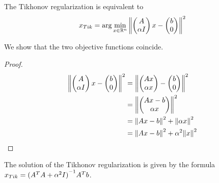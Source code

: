 \documentclass[ComputationalMathematics.tex]{subfiles}
\begin{document}
\begin{proposition}
The Tikhonov regularization is equivalent to 
\begin{equation} \label{eq:7novxtik}
  x_{Tik} = \arg \min_{x\in\mathbb{R}^n} {\left\lVert\begin{pmatrix}
    A\\
    \alpha I
\end{pmatrix} x - \begin{pmatrix}
    b\\0
\end{pmatrix}\right\rVert}^2
\end{equation}
\end{proposition}
We show that the two objective functions coincide.
\begin{proof}
  \begin{equation}
    \begin{aligned}
      {\left\lVert\begin{pmatrix}
        A\\
        \alpha I
      \end{pmatrix} x -
      \begin{pmatrix}
        b\\0
      \end{pmatrix}\right\rVert}^2 &= {\left\lVert\begin{pmatrix}
        Ax\\
        \alpha x
      \end{pmatrix} -
      \begin{pmatrix}
        b\\0
      \end{pmatrix}\right\rVert}^2\\
      &= {\left\lVert\begin{pmatrix}
        Ax - b\\
        \alpha x
      \end{pmatrix}\right\rVert}^2\\
      &= {\left\lVert Ax-b\right\rVert}^2 + {\left\lVert\alpha x\right\rVert}^2\\
      &= {\left\lVert Ax-b\right\rVert}^2 + \alpha^2 {\left\lVert x\right\rVert}^2\\
    \end{aligned}
  \end{equation}
\end{proof}

\begin{proposition}
The solution of the Tikhonov regularization is given by the formula $x_{Tik}={({A}^{T}A + {\alpha}^{2} I)}^{-1}{A}^{T} b$.
\end{proposition}
\end{document}
